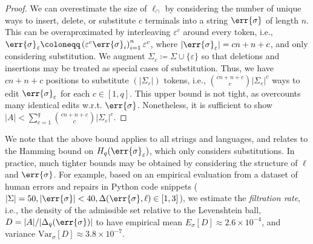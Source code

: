 \documentclass[runningheads]{llncs}
\begin{document}
  \begin{proof}
    We can overestimate the size of $\ell_\cap$ by considering the number of unique ways to insert, delete, or substitute $c$ terminals into a string $\err{\sigma}$ of length $n$. This can be overaproximated by interleaving $\varepsilon^c$ around every token, i.e., $\err{\sigma}_\varepsilon\coloneqq \left(\varepsilon^c\err{\sigma}_i\right)_{i=1}^n\varepsilon^c$, where $|\err{\sigma}_\varepsilon| = cn + n + c$, and only considering substitution. We augment $\Sigma_\varepsilon \coloneqq \Sigma \cup \{\varepsilon\}$ so that deletions and insertions may be treated as special cases of substitution. Thus, we have $cn + n + c$ positions to substitute $(|\Sigma_\varepsilon|)$ tokens, i.e., ${{cn + n + c} \choose c}|\Sigma_\varepsilon|^c$ ways to edit $\err{\sigma}_\varepsilon$ for each $c \in [1, q]$. This upper bound is not tight, as overcounts many identical edits w.r.t. $\err{\sigma}$. Nonetheless, it is sufficient to show $|A| < \sum_{c=1}^q{{cn + n + c} \choose c}|\Sigma_\varepsilon|^c$.
  \end{proof}

  We note that the above bound applies to all strings and languages, and relates to the Hamming bound on $H_q(\err{\sigma}_\varepsilon)$, which only considers substitutions. In practice, much tighter bounds may be obtained by considering the structure of $\ell$ and $\err{\sigma}$. For example, based on an empirical evaluation from a dataset of human errors and repairs in Python code snippets ($|\Sigma| = 50, |\err{\sigma}| < 40, \Delta(\err{\sigma}, \ell) \in [1, 3]$), we estimate the \textit{filtration rate}, i.e., the density of the admissible set relative to the Levenshtein ball, $D=|A|/|\Delta_q(\err{\sigma})|$ to have empirical mean $E_\sigma[D] \approx 2.6\times 10^{-4}$, and variance $\mathrm{Var}_\sigma[D] \approx 3.8\times10^{-7}$.

\end{document}
